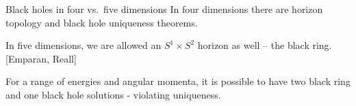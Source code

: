 \documentclass{beamer}
\newcommand{\rref}[1]{\hfill \small{\color{darkgrey} [#1]}}
\begin{document}

\begin{frame}{Black holes in four vs.\ five dimensions}
%
  In four dimensions there are horizon topology and black hole uniqueness theorems.

 \vp In five dimensions, we are allowed an $S^1 \times S^2$ horizon as well -- \alert{the black ring}. \rref{Emparan, Reall} 

 \begin{center}
   
 \end{center}
 For a range of energies and angular momenta, it is possible to have two black ring and one black hole solutions - violating uniqueness.
%
\end{frame}
%
%
%
%
%
%
%   
\end{document}
